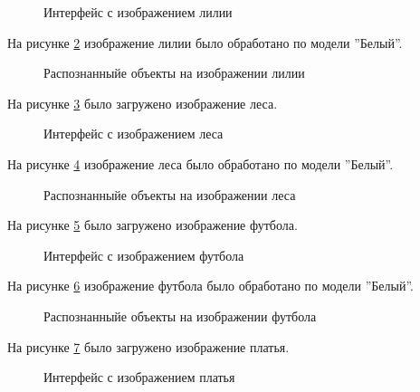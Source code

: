\begin{figure}[H]
\caption{Интерфейс с изображением лилии}
\label{systemtest_responce7:image}
\end{figure}

На рисунке \ref{systemtest_responce8:image} изображение лилии было обработано по модели ''Белый''.

\begin{figure}[H]
\caption{Распознанныйе объекты на изображении лилии}
\label{systemtest_responce8:image}
\end{figure}
На рисунке \ref{systemtest_responce9:image} было загружено изображение леса.

\begin{figure}[H]
\caption{Интерфейс с изображением леса}
\label{systemtest_responce9:image}
\end{figure}

На рисунке \ref{systemtest_responce10:image} изображение леса было обработано по модели ''Белый''.

\begin{figure}[H]
\caption{Распознанныйе объекты на изображении леса}
\label{systemtest_responce10:image}
\end{figure}
На рисунке \ref{systemtest_responce11:image} было загружено изображение футбола.

\begin{figure}[H]
\caption{Интерфейс с изображением футбола}
\label{systemtest_responce11:image}
\end{figure}

На рисунке \ref{systemtest_responce12:image} изображение футбола было обработано по модели ''Белый''.

\begin{figure}[H]
\caption{Распознанныйе объекты на изображении футбола}
\label{systemtest_responce12:image}
\end{figure}
На рисунке \ref{systemtest_responce13:image} было загружено изображение платья.

\begin{figure}[H]
\caption{Интерфейс с изображением платья}
\label{systemtest_responce13:image}
\end{figure}

